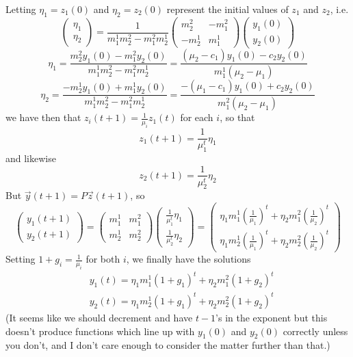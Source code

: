 Letting $\eta_1 = z_1(0)$ and $\eta_2 = z_2(0)$ represent the initial values of $z_1$ and $z_2$, i.e.
\[ \begin{pmatrix} \eta_1 \\ \eta_2 \end{pmatrix} = \frac{1}{m^1_1m^2_2-m^2_1m^1_2} \begin{pmatrix} m^2_2 & -m^2_1 \\ -m^1_2 & m^1_1 \end{pmatrix} \begin{pmatrix} y_1(0) \\ y_2(0) \end{pmatrix} \]
\[ \eta_1 = \frac{m^2_2y_1(0)-m^2_1y_2(0)}{m^1_1m^2_2-m^2_1m^1_2} = \frac{(\mu_2-c_1)y_1(0)-c_2y_2(0)}{m^1_1(\mu_2-\mu_1)} \]
\[ \eta_2 = \frac{-m^1_2y_1(0)+m^1_1y_2(0)}{m^1_1m^2_2-m^2_1m^1_2} = \frac{-(\mu_1-c_1)y_1(0)+c_2y_2(0)}{m^2_1(\mu_2-\mu_1)} \]
 we have then that $z_i(t+1) = \frac{1}{\mu_i}z_1(t)$ for each $i$, so that 
\[ z_1(t+1) = \frac{1}{\mu_1^t}\eta_1 \]
and likewise
\[ z_2(t+1) = \frac{1}{\mu_2^t}\eta_2 \]
But $\vec{y}(t+1) = P\vec{z}(t+1)$, so 
\[ \begin{pmatrix} y_1(t+1) \\ y_2(t+1) \end{pmatrix} = \begin{pmatrix} m^1_1 & m^2_1 \\ m^1_2 & m^2_2 \end{pmatrix} \begin{pmatrix} \frac{1}{\mu_1^t}\eta_1 \\ \frac{1}{\mu_2^t}\eta_2 \end{pmatrix} = \begin{pmatrix} \eta_1 m_1^1 \left(\frac{1}{\mu_1} \right)^t + \eta_2 m_1^2 \left( \frac{1}{\mu_2} \right)^t \\ \eta_1 m^1_2\left(\frac{1}{\mu_1} \right)^t + \eta_2 m^2_2 \left( \frac{1}{\mu_2} \right)^t \end{pmatrix} \]
Setting $1 + g_i = \frac{1}{\mu_i}$ for both $i$, we finally have the solutions
\begin{align}
	& y_1(t) = \eta_1 m_1^1(1+g_1)^t + \eta_2 m_1^2 (1+g_2)^t \\
	& y_2(t) = \eta_1 m_2^1(1+g_1)^t + \eta_2 m_2^2 (1+g_2)^t
\end{align}
(It seems like we should decrement and have $t-1$'s in the exponent but this doesn't produce functions which line up with $y_1(0)$ and $y_2(0)$ correctly unless you don't, and I don't care enough to consider the matter further than that.)

